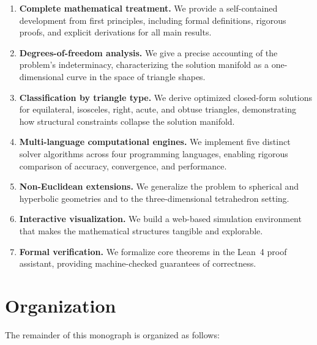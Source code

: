 \begin{enumerate}
    \item \textbf{Complete mathematical treatment.} We provide a self-contained development from first principles, including formal definitions, rigorous proofs, and explicit derivations for all main results.

    \item \textbf{Degrees-of-freedom analysis.} We give a precise accounting of the problem's indeterminacy, characterizing the solution manifold as a one-dimensional curve in the space of triangle shapes.

    \item \textbf{Classification by triangle type.} We derive optimized closed-form solutions for equilateral, isosceles, right, acute, and obtuse triangles, demonstrating how structural constraints collapse the solution manifold.

    \item \textbf{Multi-language computational engines.} We implement five distinct solver algorithms across four programming languages, enabling rigorous comparison of accuracy, convergence, and performance.

    \item \textbf{Non-Euclidean extensions.} We generalize the problem to spherical and hyperbolic geometries and to the three-dimensional tetrahedron setting.

    \item \textbf{Interactive visualization.} We build a web-based simulation environment that makes the mathematical structures tangible and explorable.

    \item \textbf{Formal verification.} We formalize core theorems in the Lean~4 proof assistant, providing machine-checked guarantees of correctness.
\end{enumerate}

\section{Organization}

The remainder of this monograph is organized as follows:

